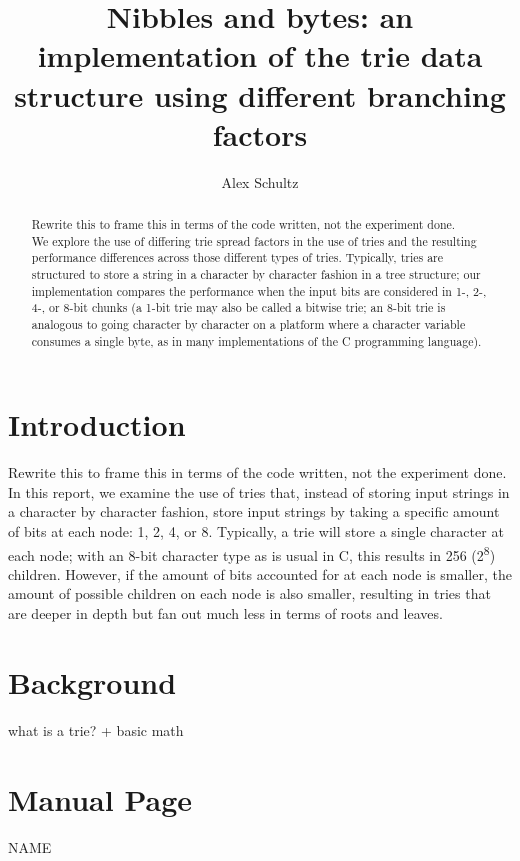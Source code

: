 \documentclass[11pt,onecolumn]{article}
\title{Nibbles and bytes: an implementation of the trie data structure using different branching factors}
\author{Alex Schultz}
\institute{Tufts University}
\begin{document}
\maketitle

\begin{abstract}
Rewrite this to frame this in terms of the code written, not the experiment done.\\
We explore the use of differing trie spread factors in the use of tries and the resulting performance differences across those different types of tries. Typically, tries are structured to store a string in a character by character fashion in a tree structure; our implementation compares the performance when the input bits are considered in 1-, 2-, 4-, or 8-bit chunks (a 1-bit trie may also be called a bitwise trie; an 8-bit trie is analogous to going character by character on a platform where a character variable consumes a single byte, as in many implementations of the C programming language).
\end{abstract}

\section{Introduction}
\label{Introduction}
Rewrite this to frame this in terms of the code written, not the experiment done.\\
In this report, we examine the use of tries that, instead of storing input strings in a character by character fashion, store input strings by taking a specific amount of bits at each node: 1, 2, 4, or 8. Typically, a trie will store a single character at each node; with an 8-bit character type as is usual in C, this results in 256 (2\textsuperscript{8}) children. However, if the amount of bits accounted for at each node is smaller, the amount of possible children on each node is also smaller, resulting in tries that are deeper in depth but fan out much less in terms of roots and leaves.

\section{Background}
what is a trie? + basic math
\newpage

\newpage
\section{Manual Page}
\noindent NAME
\end{document}
